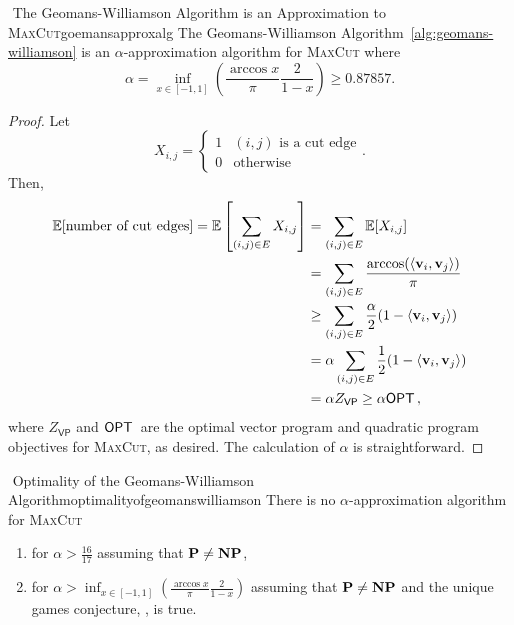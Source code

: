         \begin{theorem}{\Stop\,\,The Geomans-Williamson Algorithm is an Approximation to \textsc{MaxCut}}{goemansapproxalg}
            The Geomans-Williamson Algorithm~\ref{alg:geomans-williamson} is an \(\alpha\)-approximation algorithm for \textsc{MaxCut} where
            \begin{equation*}
                \alpha=\inf_{x\in[-1,1]}\left(\frac{\arccos x}{\pi}\frac{2}{1-x}\right)\geq0.87857.
            \end{equation*}
            \begin{proof}
                Let
                \begin{equation*}
                    X_{i,j}=\begin{cases}
                        1 & (i,j)\text{ is a cut edge} \\
                        0 & \text{otherwise}
                    \end{cases}.
                \end{equation*}
                Then,
                \begin{align*}
                    \mathbb{E}[\text{number of cut edges}]=\mathbb{E}\left[\sum_{(i,j)\in E} X_{i,j}\right]&=\sum_{(i,j)\in E}\mathbb{E}[X_{i,j}] \\
                    &=\sum_{(i,j)\in E} \frac{\arccos(\left\langle \mathbf{v}_i,\mathbf{v}_j\right\rangle)}{\pi} \\
                    &\geq \sum_{(i,j)\in E} \frac{\alpha}{2}(1-\left\langle \mathbf{v}_i,\mathbf{v}_j\right\rangle) \\
                    &=\alpha\sum_{(i,j)\in E} \frac{1}{2}(1-\left\langle \mathbf{v}_i,\mathbf{v}_j\right\rangle) \\
                    &=\alpha Z_{\mathsf{VP}}\geq \alpha\mathsf{OPT\,},
                \end{align*}
                where \(Z_{\mathsf{VP}}\) and \(\mathsf{OPT\,}\) are the optimal vector program and quadratic program objectives for \textsc{MaxCut}, as desired. The calculation of \(\alpha\) is straightforward.
            \end{proof}
        \end{theorem}
        \begin{theorem}{\Stop\,\,Optimality of the Geomans-Williamson Algorithm}{optimalityofgeomanswilliamson}
            There is no \(\alpha\)-approximation algorithm for \textsc{MaxCut}
            \begin{enumerate}
                \item for \(\alpha>\frac{16}{17}\) assuming that \(\mathbf{P}\neq\mathbf{NP}\),
                \item for \(\alpha>\inf_{x\in[-1,1]}\left(\frac{\arccos x}{\pi}\frac{2}{1-x}\right)\) assuming that \(\mathbf{P}\neq\mathbf{NP}\) and the unique games conjecture, \cite{khot2002uniquegames}, is true.
            \end{enumerate}
        \end{theorem}

